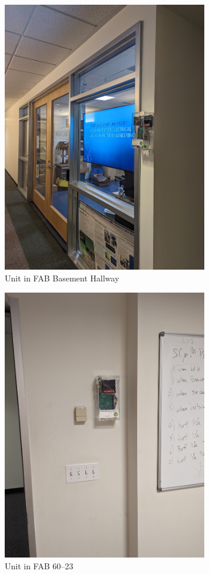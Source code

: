 \begin{figure}
    \centering
    \includegraphics[width=0.8\textwidth]{Pictures/Hallway Unit.jpg}
    \caption[Unit in FAB Basement Hallway]{Unit in FAB Basement Hallway}
    \label{fig:Unit in FAB Basement Hallway}
\end{figure}

\begin{figure}
    \centering
    \includegraphics[width=0.8\textwidth]{Pictures/60 23 unit.jpg}
    \caption[Unit in FAB 60--23]{Unit in FAB 60--23}
    \label{fig:Unit in FAB 60--23}
\end{figure}

